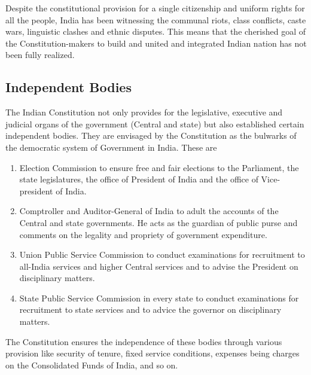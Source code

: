 Despite the constitutional provision for a single citizenship and uniform rights for all the people, India has been witnessing the communal riots, class conflicts, caste wars, linguistic clashes and ethnic disputes. This means that the cherished goal of the Constitution-makers to build and united and integrated Indian nation has not been fully realized.

\subsection{Independent Bodies}

The Indian Constitution not only provides for the legislative, executive and judicial organs of the government (Central and state) but also established certain independent bodies. They are envisaged by the Constitution as the bulwarks of the democratic system of Government in India. These are

\renewcommand{\labelenumi}{\textbf{(\alph{enumi})}}
\begin{enumerate}
  \item Election Commission to ensure free and fair elections to the Parliament, the state legislatures, the office of President of India and the office of Vice-president of India.
  \item Comptroller and Auditor-General of India to adult the accounts of the Central and state governments. He acts as the guardian of public purse and comments on the legality and propriety of government expenditure.
  \item Union Public Service Commission to conduct examinations for recruitment to all-India services and higher Central services and to advise the President on disciplinary matters.
  \item State Public Service Commission in every state to conduct examinations for recruitment to state services and to advice the governor on disciplinary matters.
\end{enumerate}

The Constitution ensures the independence of these bodies through various provision like security of tenure, fixed service conditions, expenses being charges on the Consolidated Funds of India, and so on.

